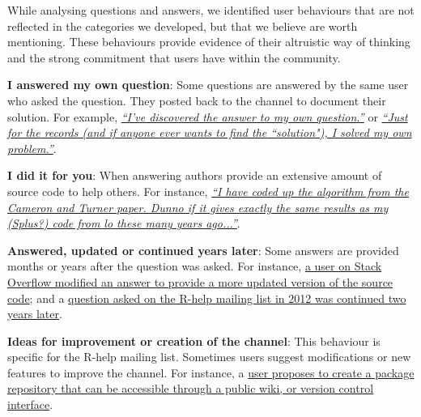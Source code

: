     While analysing questions and answers, we identified user behaviours that are not reflected in the categories we developed, but that we believe are worth mentioning.
    These behaviours provide evidence of their altruistic way of thinking and the strong commitment that users have within the community.
    \begin{packed_enum}
        \item \textbf{I answered my own question}: Some questions are answered by the same user who asked the question. They posted back to the channel to document their solution.
        For example, \textit{\href{http://goo.gl/FG59Mw}{``I've discovered the answer to my own question.''}} or \textit{\href{https://goo.gl/r3z0DX}{``Just for the records (and if anyone ever wants to find the ``solution"), I solved my own problem.''}}.

        \item \textbf{I did it for you}: When answering authors provide an extensive amount of source code to help others. For instance, \textit{\href{http://goo.gl/GXWGG3}{``I have coded up the algorithm from the Cameron and Turner paper. Dunno if it gives exactly the same results as my (Splus?) code from lo these many years ago...''}}.

        \item \textbf{Answered, updated or continued years later}: Some answers are provided months or years after the question was asked.
        For instance, \href{http://goo.gl/k6ZARR}{a user on Stack Overflow modified an answer to provide a more updated version of the source code}; and a \href{http://goo.gl/kgSHZv}{question asked on the R-help mailing list in 2012 was continued two years later}.

        \item \textbf{Ideas for improvement or creation of the channel}: This behaviour is specific for the R-help mailing list. Sometimes users suggest modifications or new features to improve the channel. For instance, a \href{http://goo.gl/p0IunD}{user proposes to create a package repository that can be accessible through a public wiki, or version control interface}.
    \end{packed_enum}

